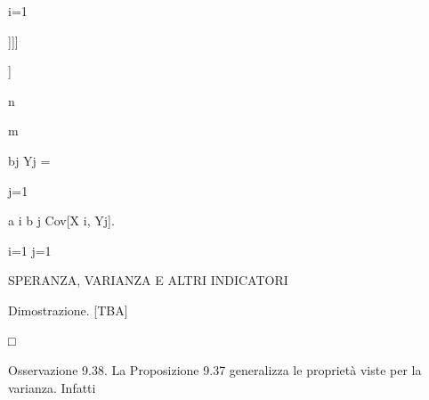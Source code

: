 \documentclass[a4paper,portrait,12pt]{article}
\begin{document}
\begin{flushleft}
i=1
\end{flushleft}





]]]


]





\begin{flushleft}
n
\end{flushleft}





\begin{flushleft}
m
\end{flushleft}





\begin{flushleft}
bj Yj =
\end{flushleft}


\begin{flushleft}
j=1
\end{flushleft}





\begin{flushleft}
a i b j Cov[X i, Yj].
\end{flushleft}


\begin{flushleft}
i=1 j=1
\end{flushleft}










\begin{flushleft}
SPERANZA, VARIANZA E ALTRI INDICATORI
\end{flushleft}





\begin{flushleft}
Dimostrazione. [TBA]
\end{flushleft}





□





\begin{flushleft}
Osservazione 9.38. La Proposizione 9.37 generalizza le propriet\`{a} viste per la varianza. Infatti
\end{flushleft}
\end{document}
